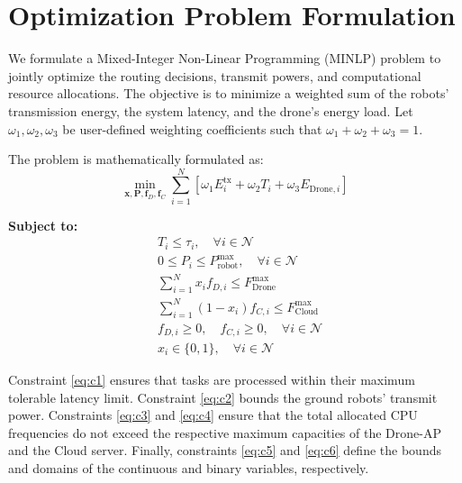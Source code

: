 \section{Optimization Problem Formulation}

We formulate a Mixed-Integer Non-Linear Programming (MINLP) problem to jointly optimize the routing decisions, transmit powers, and computational resource allocations. The objective is to minimize a weighted sum of the robots' transmission energy, the system latency, and the drone's energy load. Let $\omega_1, \omega_2, \omega_3$ be user-defined weighting coefficients such that $\omega_1 + \omega_2 + \omega_3 = 1$.


The problem is mathematically formulated as:
\begin{equation}
\min_{\mathbf{x}, \mathbf{P}, \mathbf{f}_D, \mathbf{f}_C} \sum_{i=1}^N \left[ \omega_1 E^{\text{tx}}_i + \omega_2 T_i + \omega_3 E_{\text{Drone}, i} \right]
\end{equation}

\textbf{Subject to:}
\begin{align}
& T_i \le \tau_i, \quad \forall i \in \mathcal{N} \label{eq:c1} \\
& 0 \le P_i \le P^{\text{max}}_{\text{robot}}, \quad \forall i \in \mathcal{N} \label{eq:c2} \\
& \sum_{i=1}^N x_i f_{D,i} \le F^{\text{max}}_{\text{Drone}} \label{eq:c3} \\
& \sum_{i=1}^N (1 - x_i) f_{C,i} \le F^{\text{max}}_{\text{Cloud}} \label{eq:c4} \\
& f_{D,i} \ge 0, \quad f_{C,i} \ge 0, \quad \forall i \in \mathcal{N} \label{eq:c5} \\
& x_i \in \{0, 1\}, \quad \forall i \in \mathcal{N} \label{eq:c6}
\end{align}

Constraint \eqref{eq:c1} ensures that tasks are processed within their maximum tolerable latency limit. Constraint \eqref{eq:c2} bounds the ground robots' transmit power. Constraints \eqref{eq:c3} and \eqref{eq:c4} ensure that the total allocated CPU frequencies do not exceed the respective maximum capacities of the Drone-AP and the Cloud server. Finally, constraints \eqref{eq:c5} and \eqref{eq:c6} define the bounds and domains of the continuous and binary variables, respectively.


